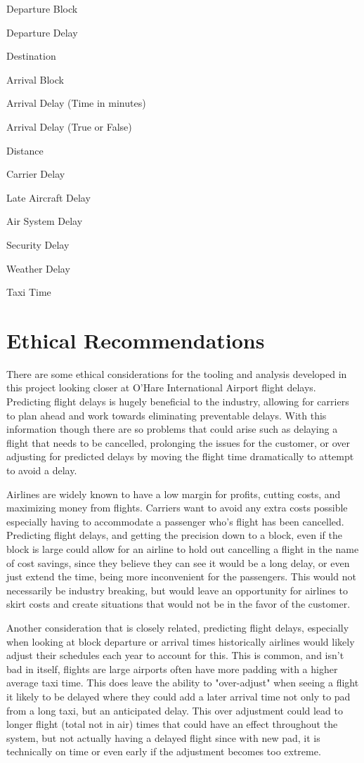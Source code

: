 \documentclass[a4paper,12pt]{article}
\begin{document}
Departure Block

Departure Delay

Destination

Arrival Block

Arrival Delay (Time in minutes)

Arrival Delay (True or False)

Distance 

Carrier Delay

Late Aircraft Delay

Air System Delay

Security Delay

Weather Delay

Taxi Time

\section{Ethical Recommendations}

There are some ethical considerations for the tooling and analysis developed in this project looking closer at O'Hare International Airport flight delays.
Predicting flight delays is hugely beneficial to the industry, allowing for carriers to plan ahead and work towards eliminating preventable delays.
With this information though there are so problems that could arise such as delaying a flight that needs to be cancelled, prolonging the issues for the customer,
or over adjusting for predicted delays by moving the flight time dramatically to attempt to avoid a delay.

Airlines are widely known to have a low margin for profits, cutting costs, and maximizing money from flights. Carriers want to avoid any extra costs possible especially 
having to accommodate a passenger who's flight has been cancelled. Predicting flight delays, and getting the precision down to a block, even if the block is large could
allow for an airline to hold out cancelling a flight in the name of cost savings, since they believe they can see it would be a long delay, or even just extend the time, being
more inconvenient for the passengers. This would not necessarily be industry breaking, but would leave an opportunity for airlines to skirt costs and create situations
that would not be in the favor of the customer.

Another consideration that is closely related, predicting flight delays, especially when looking at block departure or arrival times historically airlines would likely
adjust their schedules each year to account for this. This is common, and isn't bad in itself, flights are large airports often have more padding with a higher average taxi
time. This does leave the ability to "over-adjust" when seeing a flight it likely to be delayed where they could add a later arrival time not only to pad from a long taxi, but 
an anticipated delay. This over adjustment could lead to longer flight (total not in air) times that could have an effect throughout the system, but not actually having 
a delayed flight since with new pad, it is technically on time or even early if the adjustment becomes too extreme. 
\end{document}
